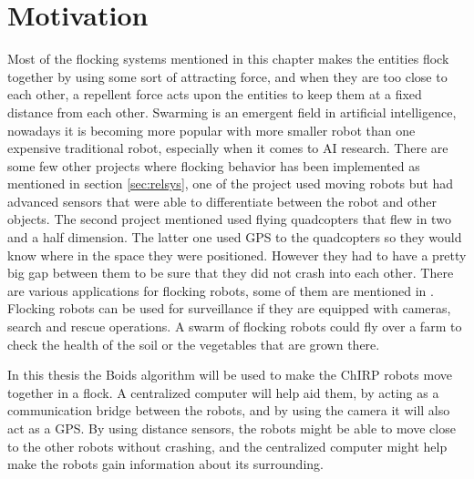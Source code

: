 \section{Motivation}
\label{sec:motivation}
Most of the flocking systems mentioned in this chapter makes the entities flock together by using some sort of attracting force, and when they are too close to each other, a repellent force acts upon the entities to keep them at a fixed distance from each other.
Swarming is an emergent field in artificial intelligence, nowadays it is becoming more popular with more smaller robot than one expensive traditional robot, especially when it comes to AI research. There are some few other projects where flocking behavior has been implemented as mentioned in section \ref{sec:relsys}, one of the project used moving robots but had advanced sensors that were able to differentiate between the robot and other objects. The second project mentioned used flying quadcopters that flew in two and a half dimension. The latter one used GPS to the quadcopters so they would know where in the space they were positioned. However they had to have a pretty big gap between them to be sure that they did not crash into each other.
There are various applications for flocking robots, some of them are mentioned in \citep{Csaba}. Flocking robots can be used for surveillance if they are equipped with cameras, search and rescue operations. A swarm of flocking robots could fly over a farm to check the health of the soil or the vegetables that are grown there. 

In this thesis the Boids algorithm will be used to make the ChIRP robots move together in a flock. A centralized computer will help aid them, by acting as a communication bridge between the robots, and by using the camera it will also act as a GPS. By using distance sensors, the robots might be able to move close to the other robots without crashing, and the centralized computer might help make the robots gain information about its surrounding.




